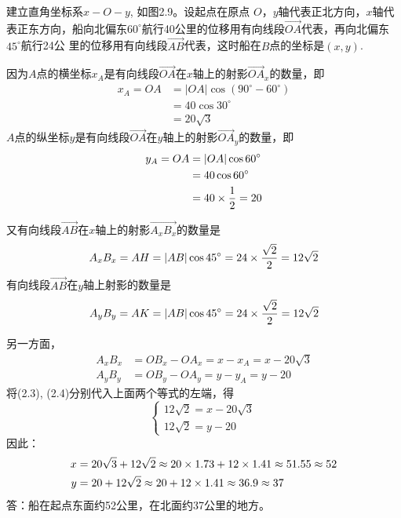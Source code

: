 \begin{solution}
    建立直角坐标系$x-O-y$, 如图2.9。设起点在原点
$O$，$y$轴代表正北方向，$x$轴代表正东方向，船向北偏东$60^{\circ}$航行40公里的位移用有向线段$\Vec{OA}$代表，再向北偏东$45^{\circ}$航行24公
里的位移用有向线段$\Vec{AB}$代表，这时船在$B$点的坐标是$(x,y)$.

因为$A$点的横坐标$x_A$是有向线段$\Vec{OA}$在$x$轴上的射影$\Vec{OA}_x$的数量，即
\begin{equation}
\begin{split}
      x_A=OA&=|OA|\cos(90^{\circ}-60^{\circ})\\
    &=  40\cos 30^{\circ}\\
    &=20\sqrt{3}
\end{split}
\end{equation}
$A$点的纵坐标$y$是有向线段$\Vec{OA}$在$y$轴上的射影$\Vec{OA}_y$的数量，即
\begin{equation}
    \begin{split}
y_A=OA&=|OA|\cos60^{\circ}\\
&=40\cos60^{\circ}\\
&=40\times\dfrac{1}{2}=20        
    \end{split}
\end{equation}

又有向线段$\Vec{AB}$在$x$轴上的射影$\Vec{A_xB_x}$的数量是
\begin{equation}
A_xB_x=AH=|AB|\cos45^{\circ}=24\times\dfrac{\sqrt{2}}{2}=12\sqrt{2}        
\end{equation}
有向线段$\Vec{AB}$在$y$轴上射影的数量是
\begin{equation}
    A_yB_y=AK=|AB|\cos45^{\circ}=24\times\dfrac{\sqrt{2}}{2}=12\sqrt{2}        
    \end{equation}

另一方面，
\[\begin{split}
    A_xB_x&=OB_x-OA_x=x-x_A=x-20\sqrt{3}\\
    A_yB_y&=OB_y-OA_y=y-y_A=y-20 
\end{split}\]
将(2.3), (2.4)分别代入上面两个等式的左端，得
\[\begin{cases}
    12\sqrt{2}=x-20\sqrt{3}\\
    12\sqrt{2}=y-20
\end{cases}\]
因此：
\[\begin{split}
    x&=20\sqrt{3}+12\sqrt{2}\approx 20\times 1.73+12\times 1.41 \approx 51.55\approx 52\\
    y&=20+12\sqrt{2}\approx 20+12\times 1.41\approx 36.9\approx 37
\end{split}\]
答：船在起点东面约52公里，在北面约37公里的地方。
\end{solution}

